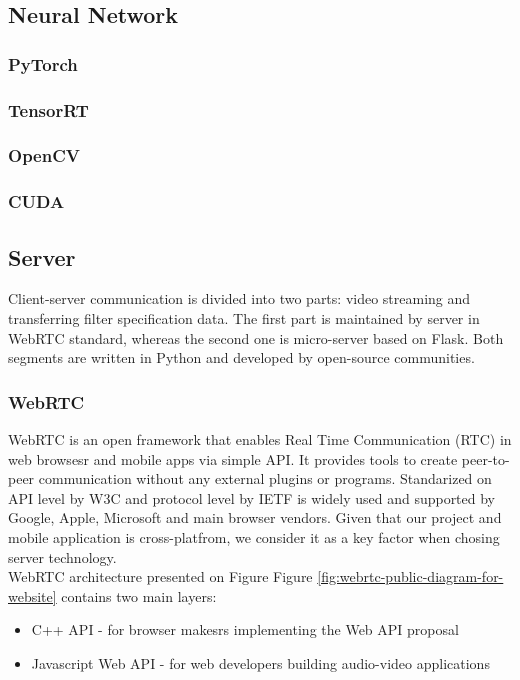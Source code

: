 \documentclass[../Main.tex]{subfiles}
\begin{document}
\subsection{Neural Network}
    \subsubsection{PyTorch}
        
        
    \subsubsection{TensorRT}
    \subsubsection{OpenCV}
        
    \subsubsection{CUDA}
    
\newpage
\subsection{Server}
    Client-server communication is divided into two parts: video streaming and transferring filter specification data. The first part is maintained by server in WebRTC standard, whereas the second one is micro-server based on Flask. Both segments are written in Python and developed by open-source communities.

    \subsubsection{WebRTC}
    WebRTC is an open framework that enables Real Time Communication (RTC) in web browsesr and mobile apps via simple API. It provides tools to create peer-to-peer communication without any external plugins or programs. Standarized on API level by W3C  and protocol level by IETF  is widely used and supported by Google, Apple, Microsoft and main browser vendors. Given that our project and mobile application is cross-platfrom, we consider it as a key factor when chosing server technology. \\
    WebRTC architecture presented on Figure Figure \ref{fig:webrtc-public-diagram-for-website} contains two main layers: 
    \begin{itemize}
    \item C++ API - for browser makesrs implementing the Web API proposal
    \item Javascript Web API - for web developers building audio-video applications \\
    \end{itemize}
    
\end{document}
